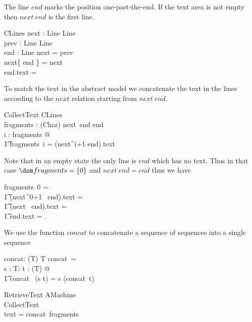 \documentclass{article}
\begin{document}
The line $end$ marks the position one-past-the-end. If the text
area is not empty then $next~end$ is the first line. 

\begin{schema}{CLines}
  next : Line \inj Line \\ 
  prev : Line \inj Line \\ 
  end : Line
\where
  next = prev \inv \\ 
  next\star \limg \{ end \} \rimg = \dom next \\
  end.text = \langle \rangle 
\end{schema}

To match the text in the abstract model we concatenate the text in
the lines according to the $next$ relation starting from $next~end$.

\begin{schema}{CollectText}
  CLines \\
  fragments : \seq (\seq Char)
\where
  next~end \neq end \\
  \forall i : \dom fragments @ \\
\t1 fragments~i = (next^{i+1} end).text
\end{schema}

Note that in an empty state the only line is $end$ which has no text. 
Thus in that case $\dom fragments = \{0\}$ and $next~end = end$ thus we have 

\begin{argue}
fragments~0 = \\
\t1 (next^{0+1}~ end).text = \\
\t1 (next~ end).text = \\
\t1 end.text = \langle\rangle.
\end{argue}

We use the function $concat$ to concatenate a sequence of sequences
into a single sequence

\begin{gendef}[T]
  concat: \seq (\seq T) \fun \seq T
\where
  concat~\langle \rangle = \langle \rangle \\
  \forall s : \seq T; t : \seq (\seq T) @ \\
\t1 concat~ (\langle s \rangle \cat t) = s \cat (concat~t)
\end{gendef}

\begin{schema}{RetrieveText}
  AMachine \\
  CollectText \\
\where
  text = concat~fragments
\end{schema}
\end{document}
